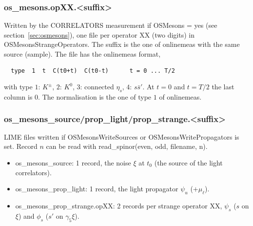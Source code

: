 \subsubsection*{\ttfamily os\_mesons.opXX.<suffix>}
Written by the {\ttfamily CORRELATORS} measurement if {\ttfamily OSMesons = yes}
(see section~\ref{sec:osmesons}), one file per operator {\ttfamily XX} (two digits) in
{\ttfamily OSMesonsStrangeOperators}. The suffix is the one of {\ttfamily onlinemeas} with the same
source (sample). The file has the {\ttfamily onlinemeas} format,
\begin{verbatim}
  type  1  t  C(t0+t)  C(t0-t)      t = 0 ... T/2
\end{verbatim}
with {\ttfamily type} $1$: $K^\pm$, $2$: $K^0$, $3$: connected $\eta_s$, $4$: $s\bar s'$.
At $t=0$ and $t=T/2$ the last column is $0$. The normalisation is the one of type $1$ of
{\ttfamily onlinemeas}.

\subsubsection*{\ttfamily os\_mesons\_source/prop\_light/prop\_strange.<suffix>}
{\sloppy LIME files written if {\ttfamily OSMesonsWriteSources} or {\ttfamily OSMesonsWritePropagators}
is set. Record $n$ can be read with {\ttfamily read\_spinor(even, odd, filename, n)}.\par}
\begin{itemize}
\item {\ttfamily os\_mesons\_source}: 1 record, the noise $\xi$ at $t_0$ (the source of the light correlators).
\item {\ttfamily os\_mesons\_prop\_light}: 1 record, the light propagator $\psi_u$ ($+\mu_\ell$).
\item {\ttfamily os\_mesons\_prop\_strange.opXX}: 2 records per strange operator {\ttfamily XX},
  $\psi_s$ ($s$ on $\xi$) and $\phi_s$ ($s'$ on $\gamma_5\xi$).
\end{itemize}

